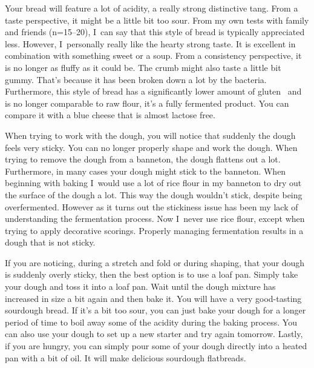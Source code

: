 Your bread will feature a lot of acidity, a really strong distinctive tang. From
a taste perspective, it might be a little bit too sour. From my own tests with family and
friends (n=15--20), I~can say that this style of bread is typically
appreciated less. However, I~personally really like the hearty strong taste.
It is excellent in combination with something
sweet or a soup.  From a consistency perspective, it is no longer as fluffy as it could be.
The crumb might also taste a little bit gummy. That's because it has been broken down a lot
by the bacteria. Furthermore, this style of bread has a significantly lower amount of gluten~\cite{raffaella+di+cagno}
and is no longer comparable to raw flour, it's a fully fermented product.
You can compare it with a blue cheese that is almost lactose free.

When trying to work with the dough, you will notice that suddenly the dough feels
very sticky. You can no longer properly shape and work the dough. When trying to
remove the dough from a banneton, the dough flattens out a lot. Furthermore,
in many cases your dough might stick to the banneton. When beginning with baking
I~would use a lot of rice flour in my banneton to dry out the surface of the dough a lot.
This way the dough wouldn't stick, despite being overfermented. However as it
turns out the stickiness issue has been my lack of understanding the fermentation
process. Now I~never use rice flour, except when trying to apply decorative scorings.
Properly managing fermentation results in a dough that is not sticky.

If you are noticing, during a stretch and fold or during shaping, that your dough
is suddenly overly sticky, then the best option is to use a loaf pan. Simply take
your dough and toss it into a loaf pan. Wait until the dough mixture has increased
in size a bit again and then bake it. You will have a very good-tasting sourdough
bread. If it's a bit too sour, you can just bake your dough for a longer period
of time to boil away some of the acidity during the baking process. You can also use
your dough to set up a new starter and try again tomorrow. Lastly, if you are hungry,
you can simply pour some of your dough directly into a heated pan with a bit of
oil. It will make delicious sourdough flatbreads.


